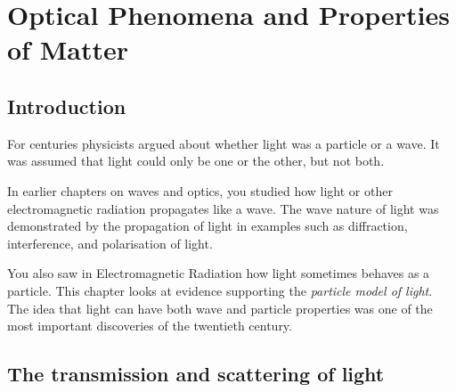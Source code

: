 \chapter{Optical Phenomena and Properties of Matter}
\label{p:mm:op12}



\section {Introduction}
For centuries physicists argued about whether light was a particle or a wave. It was assumed that light could only be one or the other, but not both.
 

In earlier chapters on waves and optics, you studied how light or other electromagnetic radiation propagates like a wave. The wave nature of light was demonstrated by the propagation of light in examples such as diffraction, interference, and polarisation of light.

 
You also saw in Electromagnetic Radiation how light sometimes behaves as a particle. This chapter looks at evidence supporting the \textit{particle model of light}. The idea that light can have both wave and particle properties was one of the most important discoveries of the twentieth century.

\section{The transmission and scattering of light}

